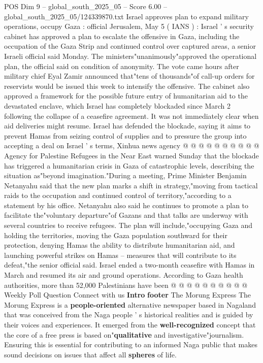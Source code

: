 \begin{textsample}{POS Dim 9 – global\_south\_2025\_05 – Score 6.00 – global\_south\_2025\_05/124339870.txt}  \label{ex:f9_pos_207}
Israel approves plan to expand military operations, occupy Gaza : official Jerusalem, May 5 ( IANS ) : Israel ' s security cabinet has approved a plan to escalate the offensive in Gaza, including the occupation of the Gaza Strip and continued control over captured areas, a senior Israeli official said Monday.
The ministers"unanimously"approved the operational plan, the official said on condition of anonymity.
The vote came hours after military chief Eyal Zamir announced that"tens of thousands"of call-up orders for reservists would be issued this week to intensify the offensive.
The cabinet also approved a framework for the possible future entry of humanitarian aid to the devastated enclave, which Israel has completely blockaded since March 2 following the collapse of a ceasefire agreement.
It was not immediately clear when aid deliveries might resume.
Israel has defended the blockade, saying it aims to prevent Hamas from seizing control of supplies and to pressure the group into accepting a deal on Israel ' s terms, Xinhua news agency @ @ @ @ @ @ @ @ @ @ Agency for Palestine Refugees in the Near East warned Sunday that the blockade has triggered a humanitarian crisis in Gaza of catastrophic levels, describing the situation as"beyond imagination."During a meeting, Prime Minister Benjamin Netanyahu said that the new plan marks a shift in strategy,"moving from tactical raids to the occupation and continued control of territory,"according to a statement by his office.
Netanyahu also said he continues to promote a plan to facilitate the"voluntary departure"of Gazans and that talks are underway with several countries to receive refugees.
The plan will include,"occupying Gaza and holding the territories, moving the Gaza population southward for their protection, denying Hamas the ability to distribute humanitarian aid, and launching powerful strikes on Hamas -- measures that will contribute to its defeat,"the senior official said.
Israel ended a two-month ceasefire with Hamas in March and resumed its air and ground operations.
According to Gaza health authorities, more than 52,000 Palestinians have been @ @ @ @ @ @ @ @ @ @ Weekly Poll Question Connect with us \textbf{Intro} \textbf{footer} The Morung Express The Morung Express is a \textbf{people-oriented} alternative newspaper based in Nagaland that was conceived from the Naga people ' s historical realities and is guided by their voices and experiences.
It emerged from the \textbf{well-recognized} concept that the core of a free press is based on"\textbf{qualitative} and investigative"journalism.
Ensuring this is essential for contributing to an informed Naga public that makes sound decisions on issues that affect all \textbf{spheres} of life.

\end{textsample}
